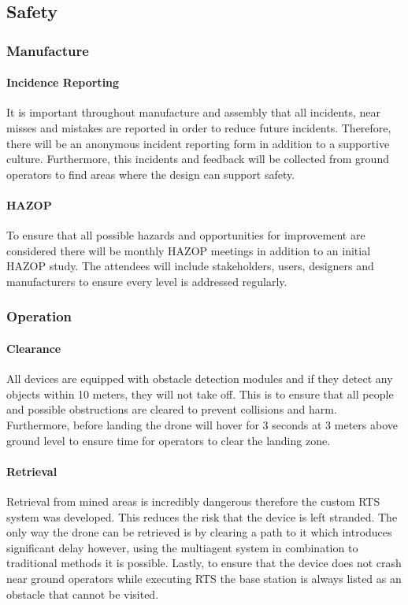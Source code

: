 \subsection{Safety}\label{sub_section:tgt_safety}
\subsubsection{Manufacture}\label{sub_sub_section:tgt_safety_manufacture}
\paragraph{Incidence Reporting}
It is important throughout manufacture and assembly that all incidents, near misses and mistakes are reported in order to reduce future incidents. Therefore, there will be an anonymous incident reporting form in addition to a supportive culture. Furthermore, this incidents and feedback will be collected from ground operators to find areas where the design can support safety.
\paragraph{\gls{HAZOP}}
To ensure that all possible hazards and opportunities for improvement are considered there will be monthly \gls{HAZOP} meetings in addition to an initial \gls{HAZOP} study. The attendees will include stakeholders, users, designers and manufacturers to ensure every level is addressed regularly.

\subsubsection{Operation}\label{sub_sub_section:tgt_safety_operation}
\paragraph{Clearance}
All devices are equipped with obstacle detection modules and if they detect any objects within 10 meters, they will not take off. This is to ensure that all people and possible obstructions are cleared to prevent collisions and harm. Furthermore, before landing the drone will hover for 3 seconds at 3 meters above ground level to ensure time for operators to clear the landing zone.
\paragraph{Retrieval}
Retrieval from mined areas is incredibly dangerous therefore the custom \gls{RTS} system was developed. This reduces the risk that the device is left stranded. The only way the drone can be retrieved is by clearing a path to it which introduces significant delay however, using the multiagent system in combination to traditional methods it is possible. Lastly, to ensure that the device does not crash near ground operators while executing \gls{RTS} the base station is always listed as an obstacle that cannot be visited.

